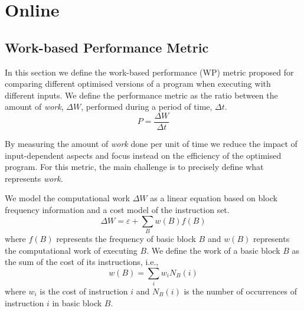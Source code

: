 
\chapter{Online {\IterComp}}

\section{Work-based Performance Metric}\label{sec:metric}

In this section we define the work-based performance (WP) metric proposed for comparing different optimised versions of a program when executing with different inputs.
We define the performance metric as the ratio between the amount of \textit{work}, $\Delta W$, performed during a period of time, $\Delta t$.
\[
   P = \frac{\Delta W}{\Delta t}
\]

By measuring the amount of \textit{work} done per unit of time we reduce the impact of input-dependent aspects and focus instead on the efficiency of the optimised program.
For this metric, the main challenge is to precisely define what represents \textit{work}.



We model the computational work $\Delta W$ as a linear equation based on block frequency information and a cost model of the instruction set.
\[
\Delta W = \varepsilon + \sum_{B} w(B)f(B)
\]
where $f(B)$ represents the frequency of basic block $B$ and $w(B)$ represents the computational work of executing $B$.
We define the work of a basic block $B$ as the sum of the cost of its instructions, i.e.,
\[
w(B) = \sum_{i} w_i N_B(i)
\]
where $w_i$ is the cost of instruction $i$ and $N_B(i)$ is the number of occurrences of instruction $i$ in basic block $B$.

